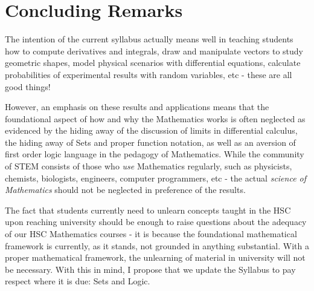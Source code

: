 \documentclass[11pt, a4paper, oneside]{article}
\begin{document}
\section{Concluding Remarks}
The intention of the current syllabus actually means well in teaching students how to compute derivatives and integrals, draw and manipulate vectors to study geometric shapes, model physical scenarios with differential equations, calculate probabilities of experimental results with random variables, etc - these are all good things!

However, an emphasis on these results and applications means that the foundational aspect of how and why the Mathematics works is often neglected as evidenced by the hiding away of the discussion of limits in differential calculus, the hiding away of Sets and proper function notation, as well as an aversion of first order logic language in the pedagogy of Mathematics. While the community of STEM consists of those who \emph{use} Mathematics regularly, such as physicists, chemists, biologists, engineers, computer programmers, etc - the actual \emph{science of Mathematics} should not be neglected in preference of the results.

The fact that students currently need to unlearn concepts taught in the HSC upon reaching university should be enough to raise questions about the adequacy of our HSC Mathematics courses - it is because the foundational mathematical framework is currently, as it stands, not grounded in anything substantial. With a proper mathematical framework, the unlearning of material in university will not be necessary. With this in mind, I propose that we update the Syllabus to pay respect where it is due: Sets and Logic.
\end{document}
